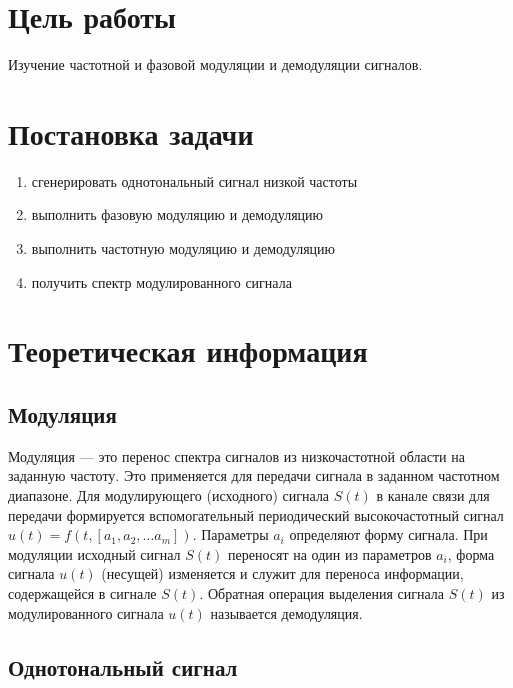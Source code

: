 

\setcounter{tocdepth}{3}







\section{Цель работы}
Изучение частотной и фазовой модуляции и демодуляции сигналов.
\section{Постановка задачи}
\begin{enumerate}
\item  сгенерировать однотональный сигнал низкой частоты 
\item  выполнить фазовую модуляцию и демодуляцию 
\item  выполнить частотную модуляцию и демодуляцию 
\item  получить спектр модулированного сигнала
\end{enumerate}

\section{Теоретическая информация}

\subsection{Модуляция}
Модуляция --- это перенос спектра сигналов из низкочастотной области на заданную частоту. 
Это применяется для передачи сигнала в заданном частотном диапазоне.
Для модулирующего (исходного) сигнала $ S(t) $ в канале связи для передачи формируется  вспомогательный периодический высокочастотный сигнал $u(t)=f(t, [a_1,   a_2,   ...   a_m])$. Параметры $a_i$ определяют форму сигнала. 
При модуляции исходный сигнал $S(t)$ переносят на один из параметров $a_i$, форма сигнала $u(t)$ (несущей) изменяется и 
служит для переноса информации, содержащейся в сигнале $S(t)$. Обратная операция выделения сигнала $S(t)$ из 
модулированного сигнала $u(t)$ называется демодуляция.

\subsection{Однотональный сигнал}

